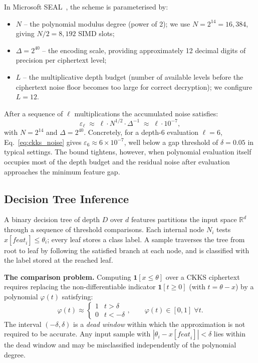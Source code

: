 \documentclass[runningheads]{llncs}
\begin{document}
In Microsoft SEAL~\cite{chen2020simple}, the scheme is parameterised by:
\begin{itemize}
  \item $N$ -- the polynomial modulus degree (power of 2); we use
        $N = 2^{14} = 16{,}384$, giving $N/2 = 8{,}192$ SIMD slots;
  \item $\Delta = 2^{40}$ -- the encoding scale, providing approximately
        12 decimal digits of precision per ciphertext level;
  \item $L$ -- the multiplicative depth budget (number of available levels
        before the ciphertext noise floor becomes too large for correct
        decryption); we configure $L = 12$.
\end{itemize}

After a sequence of $\ell$ multiplications the accumulated noise satisfies:
\begin{equation}
  \varepsilon_{\ell} \;\approx\; \ell \cdot N^{1/2} \cdot \Delta^{-1}
  \;\approx\; \ell \cdot 10^{-7},
  \label{eq:ckks_noise}
\end{equation}
with $N = 2^{14}$ and $\Delta = 2^{40}$.  Concretely, for a depth-6
evaluation $\ell = 6$, Eq.~\eqref{eq:ckks_noise} gives
$\varepsilon_6 \approx 6 \times 10^{-7}$, well below a gap threshold of
$\delta = 0.05$ in typical settings.  The bound tightens, however, when
polynomial evaluation itself occupies most of the depth budget and the
residual noise after evaluation approaches the minimum feature gap.

\subsection{Decision Tree Inference}

A binary decision tree of depth $D$ over $d$ features partitions the input
space $\mathbb{R}^d$ through a sequence of threshold comparisons.  Each
internal node $N_i$ tests $x[\mathit{feat}_i] \leq \theta_i$; every leaf
stores a class label.  A sample traverses the tree from root to leaf by
following the satisfied branch at each node, and is classified with the
label stored at the reached leaf.

\textbf{The comparison problem.}  Computing $\mathbf{1}[x \leq \theta]$
over a CKKS ciphertext requires replacing the non-differentiable
indicator $\mathbf{1}[t \geq 0]$ (with $t = \theta - x$) by a polynomial
$\varphi(t)$ satisfying:
\begin{equation}
  \varphi(t) \approx
  \begin{cases} 1 & t > \delta \\ 0 & t < -\delta \end{cases},
  \qquad \varphi(t) \in [0,1] \;\forall t.
  \label{eq:step_approx}
\end{equation}
The interval $(-\delta, \delta)$ is a \emph{dead window} within which the
approximation is not required to be accurate.  Any input sample with
$|\theta_i - x[\mathit{feat}_i]| < \delta$ lies within the dead window and
may be misclassified independently of the polynomial degree.
\end{document}
